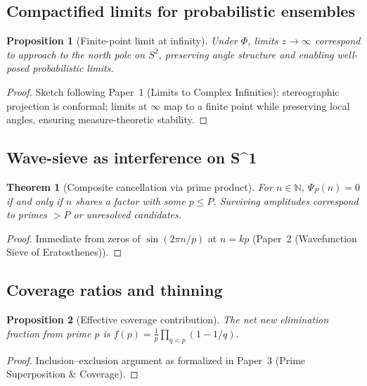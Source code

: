 \documentclass[12pt]{article}
\newcommand{\Sphere}{S^2}
\newcommand{\Circle}{S^1}
\newcommand{\N}{\mathbb{N}}
\newcommand{\Stereo}{\Phi}
\newcommand{\PaperI}{Paper~1 (Limits to Complex Infinities)}
\newcommand{\PaperII}{Paper~2 (Wavefunction Sieve of Eratosthenes)}
\newcommand{\PaperIII}{Paper~3 (Prime Superposition \& Coverage)}
\theoremstyle{plain}
\newtheorem{theorem}{Theorem}
\newtheorem{proposition}{Proposition}
\theoremstyle{definition}
\theoremstyle{remark}
\begin{document}
\subsection{Compactified limits for probabilistic ensembles}
\begin{proposition}[Finite-point limit at infinity]
Under \(\Stereo\), limits \(z\to\infty\) correspond to approach to the north pole on \(\Sphere\), preserving angle structure and enabling well-posed probabilistic limits.
\end{proposition}
\begin{proof}
Sketch following \PaperI: stereographic projection is conformal; limits at \(\infty\) map to a finite point while preserving local angles, ensuring measure-theoretic stability.
\end{proof}

\subsection{Wave-sieve as interference on \texorpdfstring{\Circle}{}}
\begin{theorem}[Composite cancellation via prime product]
For \(n\in\N\), \(\Psi_P(n)=0\) if and only if \(n\) shares a factor with some \(p\le P\). Surviving amplitudes correspond to primes \(>P\) or unresolved candidates.
\end{theorem}
\begin{proof}
Immediate from zeros of \(\sin(2\pi n/p)\) at \(n=kp\) (\PaperII).
\end{proof}

\subsection{Coverage ratios and thinning}
\begin{proposition}[Effective coverage contribution]
The net new elimination fraction from prime \(p\) is \(f(p)=\frac{1}{p}\prod_{q<p}(1-1/q)\).
\end{proposition}
\begin{proof}
Inclusion–exclusion argument as formalized in \PaperIII.
\end{proof}

\end{document}
